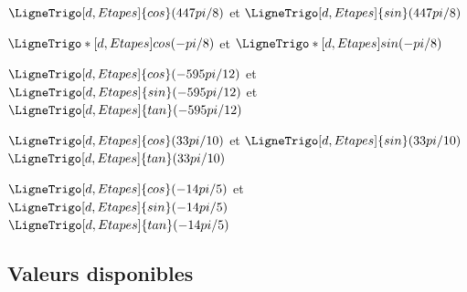 \documentclass[a4paper,french,11pt]{article}
\begin{document}
\begin{PresCodePL}{}
$\LigneTrigo[d,Etapes]{cos}(447pi/8)$ et $\LigneTrigo[d,Etapes]{sin}(447pi/8)$
\end{PresCodePL}

\begin{PresCodePL}{}
$\LigneTrigo*[d,Etapes]{cos}(-pi/8)$ et $\LigneTrigo*[d,Etapes]{sin}(-pi/8)$
\end{PresCodePL}

\begin{PresCodePL}{}
$\LigneTrigo[d,Etapes]{cos}(-595pi/12)$ et $\LigneTrigo[d,Etapes]{sin}(-595pi/12)$ et $\LigneTrigo[d,Etapes]{tan}(-595pi/12)$
\end{PresCodePL}

\begin{PresCodePL}{}
$\LigneTrigo[d,Etapes]{cos}(33pi/10)$ et $\LigneTrigo[d,Etapes]{sin}(33pi/10)$\\
$\LigneTrigo[d,Etapes]{tan}(33pi/10)$
\end{PresCodePL}

\begin{PresCodePL}{}
$\LigneTrigo[d,Etapes]{cos}(-14pi/5)$ et $\LigneTrigo[d,Etapes]{sin}(-14pi/5)$\\
$\LigneTrigo[d,Etapes]{tan}(-14pi/5)$
\end{PresCodePL}

\subsection{Valeurs disponibles}
\end{document}

